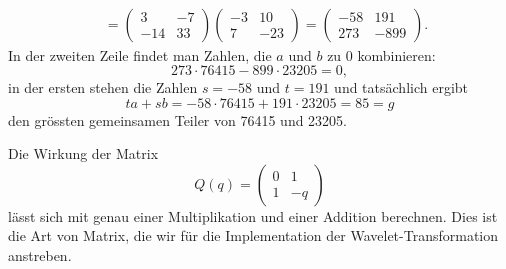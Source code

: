 \begin{beispiel}
\begin{align*}
{}_{}
\\
&=
\begin{pmatrix}  3 &  -7 \\ -14 &  33 \end{pmatrix}
\begin{pmatrix} -3 &  10 \\   7 & -23 \end{pmatrix}
=
\begin{pmatrix} -58 & 191 \\ 273 & -899 \end{pmatrix}.
\end{align*}
In der zweiten Zeile findet man Zahlen, die $a$ und $b$ zu 0 kombinieren:
\[
273 \cdot 76415 - 899 \cdot 23205 = 0,
\]
in der ersten stehen die Zahlen $s=-58$ und $t=191$ und tatsächlich
ergibt
\[
ta+sb = -58\cdot 76415  + 191\cdot 23205 = 85 = g
\]
den grössten gemeinsamen Teiler von 76415 und 23205.
\end{beispiel}

Die Wirkung der Matrix
\[
Q(q) = \begin{pmatrix} 0 & 1 \\ 1 & -q \end{pmatrix}
\]
lässt sich mit genau einer Multiplikation und einer Addition
berechnen.
Dies ist die Art von Matrix, die wir für die Implementation der
Wavelet-Transformation anstreben.


